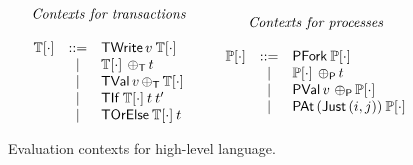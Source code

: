 \documentclass[sigplan]{acmart}
\newcommand{\EvalCtxTran}[1]{\ensuremath{\mathbb{T}[#1]}}
\newcommand{\EvalCtxProc}[1]{\ensuremath{\mathbb{P}[#1]}}
\theoremstyle{definition}
\newcommand{\C}[1]{\red{\mathsf{#1}}}
\begin{document}
\begin{figure}[h]
        \[
            \begin{array}{cc}
               \begin{array}{c}
                   \textit{Contexts for transactions} \\
                   \\
                   \begin{array}{rcl}
                      \EvalCtxTran{\cdot} & ::=    & \ensuremath{\C{TWrite}}\, v\:\EvalCtxTran{\cdot}\\
                                                   & \mid &\EvalCtxTran{\cdot}\: \ensuremath{\C{\,\oplus_T\,}} t\\
                                                   & \mid & \ensuremath{\C{TVal}}\,v \ensuremath{\C{\,\oplus_T\,}} \EvalCtxTran{\cdot}\\
                                                   & \mid & \ensuremath{\C{TIf}}\:\EvalCtxTran{\cdot}\:t\:t' \\
                                                   & \mid & \ensuremath{\C{TOrElse}}\:\EvalCtxTran{\cdot}\:t\\
                   \end{array}
               \end{array}
               &
               \begin{array}{c}
                    \textit{Contexts for processes}\\
                    \\
                    \begin{array}{rcl}
                      \EvalCtxProc{\cdot} & ::=    & \ensuremath{\C{PFork}}\:\EvalCtxProc{\cdot}\\
                                                   & \mid &\EvalCtxProc{\cdot}\:\ensuremath{\C{\,\oplus_P\,}} t\\
                                                   & \mid & \ensuremath{\C{PVal}}\,v\,\ensuremath{\C{\,\oplus_P\,}}\EvalCtxProc{\cdot}\\
                                                   & \mid & \ensuremath{\C{PAt}}\,(\ensuremath{\C{Just}}\, (i,j))\:\EvalCtxProc{\cdot}
                    \end{array}
               \end{array}
            \end{array}
        \]
        \centering
        \caption{Evaluation contexts for high-level language.}
        \label{fig:hole-syntax}
\end{figure}
\end{document}
